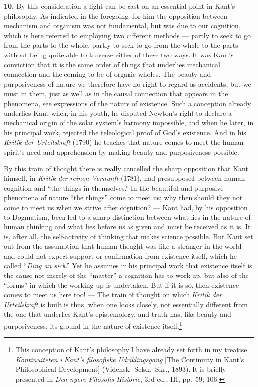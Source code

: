 \documentclass[12pt]{book}
\newcommand{\hnum}[1]{\textbf{#1.}\enspace}
\newcommand{\opage}[1]{\marginnote{\footnotesize\textit{[#1]}}}
\begin{document}
\hnum{10} By this consideration a light can be cast on an essential point in Kant's philosophy. As
indicated in the foregoing, for him the opposition between mechanism and organism was not fundamental,
but was due to our cognition, which is here referred to employing two different methods --- partly to
seek to go from the parts to the whole, partly to seek to go from the whole to the parts --- without
being quite able to traverse either of these two ways. It was Kant's conviction that it is the same
order of things that underlies mechanical connection and the coming-to-be of organic wholes. The
beauty and purposiveness of nature we therefore have no right to regard as accidents, but we must in
them, just as well as in the causal connection that appears in the phenomena, see expressions of the
nature of existence. Such a conception already underlies Kant when, in his youth, he disputed Newton's
right to declare a mechanical origin of the solar system's harmony impossible, and when he later, in
his principal work, rejected the teleological proof of God's existence. And in his \textit{Kritik der
Urteilskraft} (1790) he teaches that nature comes to meet the human spirit's need \opage{33}and apprehension by
making beauty and purposiveness possible.

By this train of thought there is really cancelled the sharp opposition that Kant himself, in
\textit{Kritik der reinen Vernunft} (1781), had presupposed between human cognition and ``the things
in themselves.'' In the beautiful and purposive phenomena of nature ``the things'' come to meet us;
why then should they not come to meet us when we strive after cognition? --- Kant had, by his
opposition to Dogmatism, been led to a sharp distinction between what lies in the nature of human
thinking and what lies before us as given and must be received as it is. It is, after all, the
self-activity of thinking that makes science possible. But Kant set out from the assumption that human
thought was like a stranger in the world and could not expect support or confirmation from existence
itself, which he called ``\textit{Ding an sich}.'' Yet he assumes in his principal work that existence
itself is the cause not merely of the ``matter'' a cognition has to work up, but also of the ``forms''
in which the working-up is undertaken. But if it is so, then existence comes to meet us here too! ---
The train of thought on which \textit{Kritik der Urteilskraft} is built is thus, when one looks
closely, not essentially different from the one that underlies Kant's epistemology, and truth has,
like beauty and purposiveness, its ground in the nature of existence itself.\footnote{This conception
of Kant's philosophy I have already set forth in my treatise \textit{Kontinuiteten i Kant's
filosofiske Udviklingsgang} [The Continuity in Kant's Philosophical Development] (Vidensk.\ Selsk.\
Skr., 1893). It is briefly presented in \textit{Den nyere Filosofis Historie}, 3rd ed., III, pp.\ 59;
106.}
\end{document}
